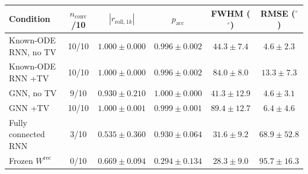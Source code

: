 \begin{tabular}{lccccc}
\toprule
Condition & $n_{\mathrm{conv}}$/10 & $|r_{\mathrm{roll},1k}|$ & $p_{\mathrm{acc}}$ & FWHM ($^\circ$) & RMSE ($^\circ$) \\
\midrule
Known-ODE RNN, no TV & 10/10 & $1.000\pm0.000$ & $0.996\pm0.002$ & $44.3\pm7.4$ & $4.6\pm2.3$ \\
Known-ODE RNN +TV & 10/10 & $1.000\pm0.000$ & $0.996\pm0.002$ & $84.0\pm8.0$ & $13.3\pm7.3$ \\
GNN, no TV & 9/10 & $0.930\pm0.210$ & $1.000\pm0.000$ & $41.3\pm12.9$ & $4.6\pm3.1$ \\
GNN +TV & 10/10 & $1.000\pm0.001$ & $0.999\pm0.001$ & $89.4\pm12.7$ & $6.4\pm4.6$ \\
Fully connected RNN & 3/10 & $0.535\pm0.360$ & $0.930\pm0.064$ & $31.6\pm9.2$ & $68.9\pm52.8$ \\
Frozen $W^{\mathrm{rec}}$ & 0/10 & $0.669\pm0.094$ & $0.294\pm0.134$ & $28.3\pm9.0$ & $95.7\pm16.3$ \\
\bottomrule
\end{tabular}
